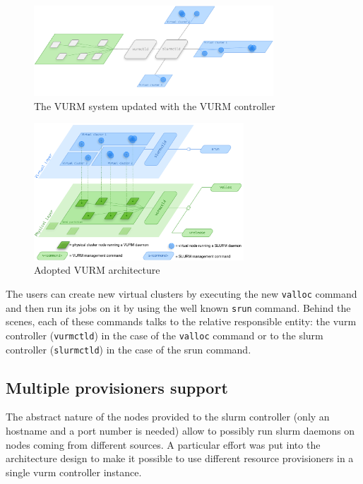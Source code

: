 \begin{figure}[ht]
	\centering
	\includegraphics[width=0.8\textwidth]{figures/slurm-vurm-pov}
	\caption{The VURM system updated with the VURM controller}
	\label{fig:slurm-vurm-pov}
\end{figure}

\begin{figure}[ht]
	\centering
	\includegraphics[width=0.7\textwidth]{figures/vurm-arch-top-down}
	\caption{Adopted VURM architecture}
	\label{fig:vurm-arch-bottom}
\end{figure}

The users can create new virtual clusters by executing the new \texttt{valloc} command and then run its jobs on it by using the well known \texttt{srun} command. Behind the scenes, each of these commands talks to the relative responsible entity: the \gls{vurm} controller (\texttt{vurmctld}) in the case of the \texttt{valloc} command or to the \gls{slurm} controller (\texttt{slurmctld}) in the case of the srun command.


\subsection{Multiple provisioners support}

The abstract nature of the nodes provided to the \gls{slurm} controller (only an hostname and a port number is needed) allow to possibly run \gls{slurm} daemons on nodes coming from different sources. A particular effort was put into the architecture design to make it possible to use different resource provisioners in a single \gls{vurm} controller instance.

